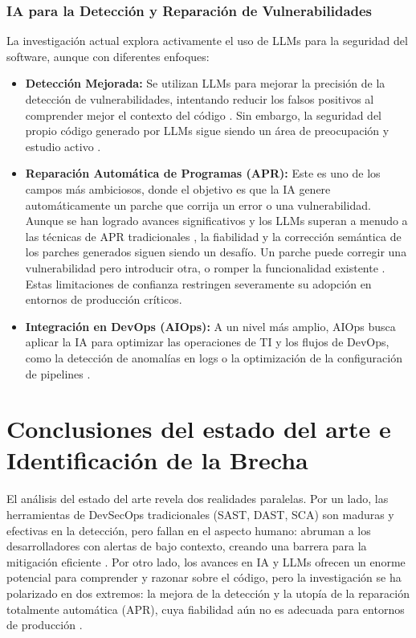 \subsubsection{IA para la Detección y Reparación de Vulnerabilidades}
La investigación actual explora activamente el uso de LLMs para la seguridad del software, aunque con diferentes enfoques:
\begin{itemize}
    \item \textbf{Detección Mejorada:} Se utilizan LLMs para mejorar la precisión de la detección de vulnerabilidades, intentando reducir los falsos positivos al comprender mejor el contexto del código \cite{GitHubAICodeReviews}. Sin embargo, la seguridad del propio código generado por LLMs sigue siendo un área de preocupación y estudio activo \cite{GitGuardian2025CopilotConcerns}.
    
    \item \textbf{Reparación Automática de Programas (APR):} Este es uno de los campos más ambiciosos, donde el objetivo es que la IA genere automáticamente un parche que corrija un error o una vulnerabilidad. Aunque se han logrado avances significativos y los LLMs superan a menudo a las técnicas de APR tradicionales \cite{Liu2024APRSurvey}, la fiabilidad y la corrección semántica de los parches generados siguen siendo un desafío. Un parche puede corregir una vulnerabilidad pero introducir otra, o romper la funcionalidad existente \cite{Fu2023Patching}. Estas limitaciones de confianza restringen severamente su adopción en entornos de producción críticos.
    
    \item \textbf{Integración en DevOps (AIOps):} A un nivel más amplio, AIOps busca aplicar la IA para optimizar las operaciones de TI y los flujos de DevOps, como la detección de anomalías en logs o la optimización de la configuración de pipelines \cite{Iglesia2021AIOps}.
\end{itemize}

\section{Conclusiones del estado del arte e Identificación de la Brecha}\label{sec:conclusionesSOTA}
El análisis del estado del arte revela dos realidades paralelas. Por un lado, las herramientas de DevSecOps tradicionales (SAST, DAST, SCA) son maduras y efectivas en la detección, pero fallan en el aspecto humano: abruman a los desarrolladores con alertas de bajo contexto, creando una barrera para la mitigación eficiente \cite{Johnson2023UsabilitySAST}. Por otro lado, los avances en IA y LLMs ofrecen un enorme potencial para comprender y razonar sobre el código, pero la investigación se ha polarizado en dos extremos: la mejora de la detección y la utopía de la reparación totalmente automática (APR), cuya fiabilidad aún no es adecuada para entornos de producción \cite{Liu2024APRSurvey}.

